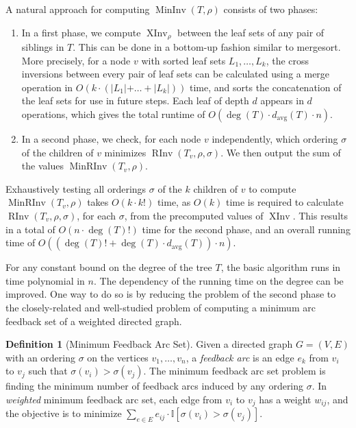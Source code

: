 \documentclass[11pt]{article}
\numberwithin{equation}{section}
\theoremstyle{definition}
\newtheorem{definition}[theorem]{Definition}
\theoremstyle{plain}
\newcommand{\depth}{d}
\newcommand{\avgdepth}{\depth_\mathrm{avg}}
\newcommand{\Indicator}{\mathbb{I}}
\newcommand{\ranking}{\rho}
\newcommand{\ordering}{\sigma}
\DeclareMathOperator{\XInv}{XInv}
\DeclareMathOperator{\MInv}{MinInv}
\DeclareMathOperator{\MRInv}{MinRInv}
\DeclareMathOperator{\RInv}{RInv}
\begin{document}
A natural approach for computing $\MInv(T,\ranking)$ consists of two phases:
\begin{enumerate}
\item In a first phase, we compute $\XInv_\ranking$ between the leaf sets of any pair of siblings in $T$. This can be done in a bottom-up fashion similar to mergesort. More precisely, for a node $v$ with sorted leaf sets $L_1,\dots,L_k$, the cross inversions between every pair of leaf sets can be calculated using a merge operation in $O(k \cdot(\lvert L_1 \lvert+\dots+\lvert L_k \lvert))$ time, and sorts the concatenation of the leaf sets for use in future steps. Each leaf of depth $d$ appears in $d$ operations, which gives the total runtime of $O(\deg(T)\cdot \avgdepth(T)\cdot n)$. 
\item In a second phase, we check, for each node $v$ independently, which ordering $\ordering$ of the children of $v$ minimizes $\RInv(T_v,\ranking,\ordering)$. We then output the sum of the values $\MRInv(T_v,\ranking)$.
\end{enumerate}
Exhaustively testing all orderings $\ordering$ of the $k$ children of $v$ to compute $\MRInv(T_v,\ranking)$ takes $O(k \cdot k!)$ time, as $O(k)$ time is required to calculate $\RInv(T_v,\ranking,\ordering)$, for each $\ordering$, from the precomputed values of $\XInv$. This results in a total of $O(n \cdot \deg(T)!)$ time for the second phase, and an overall running time of $O((\deg(T)!+\deg(T)\cdot\avgdepth(T))\cdot n)$. 

For any constant bound on the degree of the tree $T$, the basic algorithm runs in time polynomial in $n$. The dependency of the running time on the degree can be improved. One way to do so is by reducing the problem of the second phase to the closely-related and well-studied problem of computing a minimum arc feedback set of a weighted directed graph.
\begin{definition}[Minimum Feedback Arc Set]
    Given a directed graph $G=(V,E)$ with an ordering $\ordering$ on the vertices $v_1,\dots,v_n$, a \emph{feedback arc} is an edge $e_k$ from $v_i$ to $v_j$ such that $\ordering(v_i)>\ordering(v_j)$. The minimum feedback arc set problem is finding the minimum number of feedback arcs induced by any ordering $\ordering$.
    In \emph{weighted} minimum feedback arc set, each edge from $v_i$ to $v_j$ has a weight $w_{ij}$, and the objective is to minimize $\sum_{e\in E} e_{ij} \cdot \Indicator[\ordering(v_i)>\ordering(v_j)]$.
\end{definition}
\end{document}

